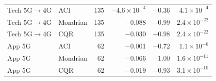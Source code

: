 \begin{table}[!t]
\begin{tabular}{llrrrr}
Tech 5G$\rightarrow$4G & ACI & 135 & $-4.6\times10^{-4}$ & $-$0.36 & $4.1\times10^{-4}$ \\
Tech 5G$\rightarrow$4G & Mondrian & 135 & $-$0.088 & $-$0.99 & $2.4\times10^{-22}$ \\
Tech 5G$\rightarrow$4G & CQR & 135 & $-$0.030 & $-$0.98 & $2.4\times10^{-22}$ \\
App 5G & ACI & 62 & $-$0.001 & $-$0.72 & $1.1\times10^{-6}$ \\
App 5G & Mondrian & 62 & $-$0.066 & $-$1.00 & $1.6\times10^{-11}$ \\
App 5G & CQR & 62 & $-$0.019 & $-$0.93 & $3.1\times10^{-10}$ \\
\bottomrule
\end{tabular}
\end{table}
